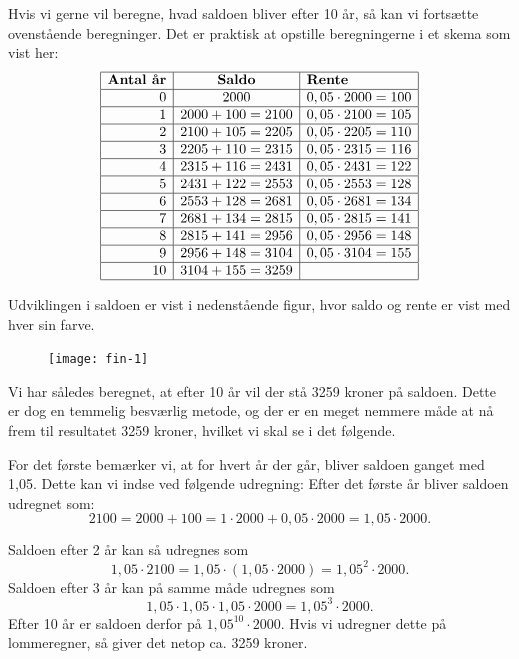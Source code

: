 \documentclass[12pt,oneside,a4paper]{article}
\begin{document}
Hvis vi gerne vil beregne, hvad saldoen bliver efter 10 år, så kan vi fortsætte
ovenstående beregninger. Det er praktisk at opstille beregningerne i et skema
som vist her:
\[
\begin{array}{|r|c|l|}
    \hline
    \mbox{\textbf{Antal år}} & \mbox{\textbf{Saldo}} & \mbox{\textbf{Rente}} \\
    \hline
0 & 2000 & 0,05\cdot 2000 = 100 \\
    \hline
1 & 2000 + 100 = 2100 & 0,05\cdot 2100 = 105 \\
    \hline
2 & 2100 + 105 = 2205 & 0,05\cdot 2205 = 110 \\
    \hline
3 & 2205 + 110 = 2315 & 0,05\cdot 2315 = 116 \\
    \hline
4 & 2315 + 116 = 2431 & 0,05\cdot 2431 = 122 \\
    \hline
5 & 2431 + 122 = 2553 & 0,05\cdot 2553 = 128 \\
    \hline
6 & 2553 + 128 = 2681 & 0,05\cdot 2681 = 134 \\
    \hline
7 & 2681 + 134 = 2815 & 0,05\cdot 2815 = 141 \\
    \hline
8 & 2815 + 141 = 2956 & 0,05\cdot 2956 = 148 \\
    \hline
9 & 2956 + 148 = 3104 & 0,05\cdot 3104 = 155 \\
    \hline
10 & 3104 + 155 = 3259 & \\
\hline
\end{array}
\]

Udviklingen i saldoen er vist i nedenstående figur, hvor saldo og rente er vist med hver sin farve.
\begin{figure}[H]
    \centering
    \texttt{[image: fin-1]}
\end{figure}

Vi har således beregnet, at efter 10 år vil der stå 3259 kroner på saldoen.  Dette
er dog en temmelig besværlig metode, og der er en meget nemmere måde at nå frem
til resultatet 3259 kroner, hvilket vi skal se i det følgende.

For det første bemærker vi, at for hvert år der går, bliver saldoen ganget med
1,05. Dette kan vi indse ved følgende udregning: Efter det første år bliver
saldoen udregnet som:
\[
2100 = 2000 + 100 = 1\cdot 2000 + 0,05\cdot 2000 = 1,05 \cdot 2000.
\]

Saldoen efter 2 år kan så udregnes som
\[
1,05\cdot 2100 = 1,05 \cdot (1,05 \cdot 2000) = 1,05^2 \cdot 2000.
\]
Saldoen efter 3 år kan på samme måde udregnes som
\[
1,05\cdot1,05\cdot1,05\cdot 2000 = 1,05^3 \cdot 2000.
\]
Efter 10 år er saldoen derfor på $1,05^{10}\cdot 2000$. Hvis vi udregner dette
på lommeregner, så giver det netop ca. 3259 kroner.
\end{document}
